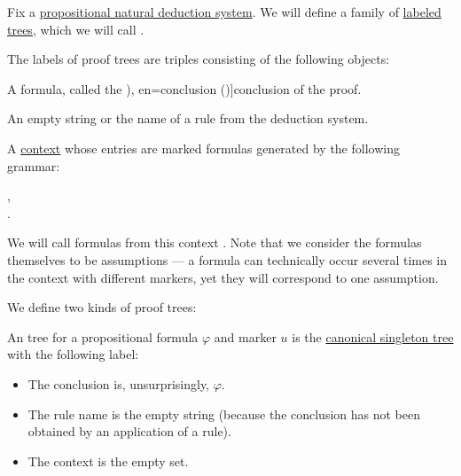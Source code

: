 \begin{definition}\label{def:natural_deduction_proof_tree}\mimprovised
  Fix a \hyperref[def:abstract_natural_deduction_system]{propositional natural deduction system}. We will define a family of \hyperref[def:labeled_tree]{labeled trees}, which we will call .

  The labels of proof trees are triples consisting of the following objects:
  \begin{thmenum}[series=def:natural_deduction_proof_tree]
     A formula, called the \term[ru=conclusion (\cite[35]{TroelstraSchwichtenberg2000Proofs}), en=conclusion (\cite[36]{TroelstraSchwichtenberg2000Proofs})]{conclusion} of the proof.

     An empty string or the name of a rule from the deduction system.

     A \hyperref[def:logical_context]{context} whose entries are marked formulas generated by the following grammar:
    \begin{bnf*}
                {}, \\
        { \bnfsp \bnftsq{:} \bnfsp {}}.
    \end{bnf*}

    We will call formulas from this context . Note that we consider the formulas themselves to be assumptions --- a formula can technically occur several times in the context with different markers, yet they will correspond to one assumption.
  \end{thmenum}

  We define two kinds of proof trees:
  \begin{thmenum}[resume=def:natural_deduction_proof_tree]
     An  tree for a propositional formula \( \varphi \) and marker \( u \) is the \hyperref[def:canonical_singleton_tree]{canonical singleton tree} with the following label:
    \begin{itemize}
      \item The conclusion is, unsurprisingly, \( \varphi \).
      \item The rule name is the empty string (because the conclusion has not been obtained by an application of a rule).
      \item The context is the empty set.
    \end{itemize}


\end{thmenum}
\end{definition}
